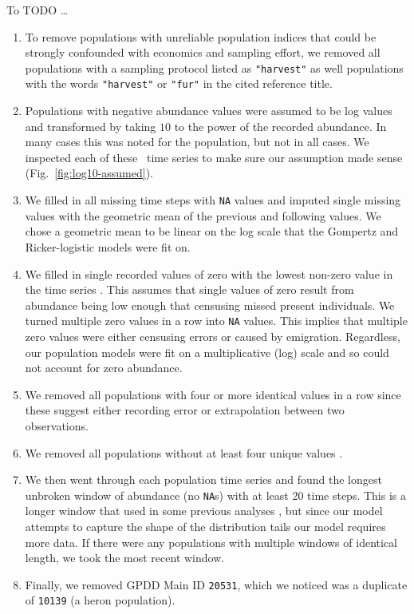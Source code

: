 \documentclass[11pt]{article}
\begin{document}
To TODO \ldots

\begin{enumerate}

\item To remove populations with unreliable population indices that could be strongly confounded with economics and sampling effort, we removed all populations with a sampling protocol listed as \texttt{"harvest"} as well populations with the words \texttt{"harvest"} or \texttt{"fur"} in the cited reference title.
\item Populations with negative abundance values were assumed to be log values and transformed by taking $10$ to the power of the recorded abundance. In many cases this was noted for the population, but not in all cases. We inspected each of these  \totalAssumedLog\ time series to make sure our assumption made sense (Fig.~\ref{fig:log10-assumed}).
\item We filled in all missing time steps with \texttt{NA} values and imputed single missing values with the geometric mean of the previous and following values. We chose a geometric mean to be linear on the log scale that the Gompertz and Ricker-logistic models were fit on.
\item We filled in single recorded values of zero with the lowest non-zero value in the time series \citep[following][]{brook2006a}. This assumes that single values of zero result from abundance being low enough that censusing missed present individuals. We turned multiple zero values in a row into \texttt{NA} values. This implies that multiple zero values were either censusing errors or caused by emigration. Regardless, our population  models were fit on a multiplicative (log) scale and so could not account for zero abundance.
\item We removed all populations with four or more identical values in a row since these suggest either recording error or extrapolation between two observations.
\item We removed all populations without at least four unique values \citep[following][]{brook2006a}.
\item We then went through each population time series and found the longest unbroken  window of abundance (no \texttt{NA}s) with at least 20 time steps. This is a longer window that used in some previous analyses \citep[e.g.][]{brook2006a}, but since our model attempts to capture the shape of the distribution tails our model requires more data. If there were any populations with multiple windows of identical length, we took the most recent window.
\item Finally, we removed GPDD Main ID \texttt{20531}, which we noticed was a duplicate of \texttt{10139} (a heron population). 
\end{enumerate}
\end{document}

